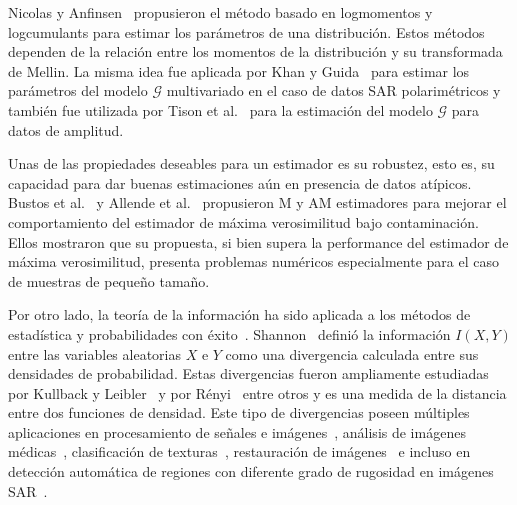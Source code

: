 Nicolas y Anfinsen~\cite{nicolas2002} propusieron el método basado en logmomentos y logcumulants para estimar los parámetros de una distribución. Estos métodos dependen de la relación entre los momentos de la distribución y su transformada de Mellin. La misma idea fue aplicada por Khan y Guida~\cite{khan2014} para estimar los parámetros del modelo $\mathcal{G}$ multivariado en el caso de datos SAR polarimétricos y también fue utilizada por Tison et al.~\cite{Tison2004} para la estimación del modelo $\mathcal{G}$ para datos de amplitud.

Unas de las propiedades deseables para un estimador es su robustez, esto es, su capacidad para dar buenas estimaciones aún en presencia de datos atípicos. Bustos et al.~\cite{BustosFreryLucini:Mestimators:2001} y Allende et al.~\cite{AllendeFreryetal:JSCS:05} propusieron M y AM estimadores para mejorar el comportamiento del estimador de máxima verosimilitud bajo contaminación. Ellos mostraron que su propuesta, si bien supera la performance del estimador de máxima verosimilitud, presenta problemas numéricos especialmente para el caso de muestras de pequeño tamaño.

Por otro lado, la teoría de la información ha sido aplicada a los métodos de estadística y probabilidades con éxito~\cite{Liese2006}. 
Shannon~\cite{Shannon1948} definió la información $I(X,Y)$ entre las variables aleatorias $X$ e $Y$ como una divergencia calculada entre sus densidades de probabilidad. 
Estas divergencias fueron ampliamente estudiadas por Kullback y Leibler~\cite{KullbackLeibler1951} y por Rényi~\cite{renyi1961} entre otros y es una medida de la distancia entre dos funciones de densidad. 
Este tipo de divergencias poseen múltiples aplicaciones en procesamiento de señales e imágenes~\cite{4218961}, análisis de imágenes médicas~\cite{5599869},
clasificación de texturas~\cite{1246862}, restauración de imágenes~\cite{1224731} e incluso en detección automática de regiones con diferente grado de rugosidad en imágenes SAR~\cite{6377288,ClassificationPolSARSegmentsMinimizationWishartDistances}.



